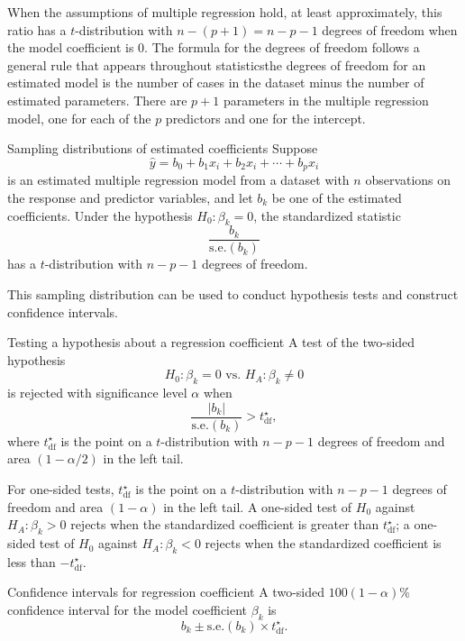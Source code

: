 When the assumptions of multiple regression hold, at least approximately, this ratio has a $t$-distribution with $n - (p + 1) =n - p - 1$ degrees of freedom when the model coefficient is 0. The formula for the degrees of freedom follows a general rule that appears throughout statistics\textemdash the degrees of freedom for an estimated model is the number of cases in the dataset minus the number of estimated parameters.  There are $p + 1$ parameters in the multiple regression model, one for each of the $p$ predictors and one for the intercept.


\begin{onebox}{Sampling distributions of estimated coefficients}
Suppose 
\[
\hat{y} = b_0 + b_1 x_{i} + b_2 x_{i} +\cdots + b_p x_{i}
\]
is an estimated multiple regression model from a dataset with $n$ observations on the response and predictor variables, and let $b_k$ be one of the estimated coefficients.  Under the hypothesis $H_0: \beta_k = 0$, the standardized statistic
\[
      \frac{b_k}{\textrm{s.e.}(b_k)}
\]
has a $t$-distribution with $n - p - 1$ degrees of freedom.
\end{onebox}

This sampling distribution can be used to conduct hypothesis tests and construct confidence intervals.

\begin{onebox}{Testing a hypothesis about a regression coefficient}
A test of the two-sided hypothesis
\[
  H_0: \beta_k = 0 \text{ vs. } H_A: \beta_k \ne 0
\]
is rejected with significance level $\alpha$ when 
\[
     \frac{|b_k|}{\textrm{s.e.}(b_k)} > t_{\text{df}}^\star,
\]
where $t_{\text{df}}^\star$ is the point on a $t$-distribution with $n - p - 1$ degrees of freedom and area $(1 - \alpha/2)$ in the left tail.
\end{onebox}

\textD{\newpage}

For one-sided tests, $t_{\text{df}}^\star$ is the point on a $t$-distribution with $n - p - 1$ degrees of freedom and area $(1 - \alpha)$ in the left tail. A one-sided test of $H_0$ against $H_A: \beta_k > 0$ rejects when the standardized coefficient is greater than  $ t_{\text{df}}^\star$; a one-sided test of $H_0$ against $H_A: \beta_k < 0$  rejects when the standardized coefficient is less than $-t_{\text{df}}^\star$. 

\begin{onebox}{Confidence intervals for regression coefficient}
A two-sided $100(1 - \alpha)$\% confidence interval for the model coefficient $\beta_k$ is 
\[
     b_k \pm {\textrm{s.e.}(b_k)} \times t_{\text{df}}^\star.
\]
\end{onebox}

